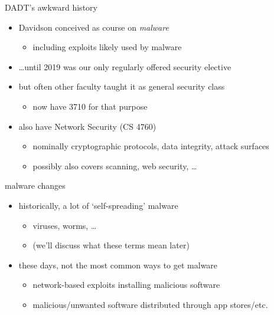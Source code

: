 \begin{frame}{DADT's awkward history}
    \begin{itemize}
    \item Davidson conceived as course on \textit{malware}
        \begin{itemize}
        \item including exploits likely used by malware
        \end{itemize}
    \item \ldots until 2019 was our only regularly offered security elective
    \vspace{.5cm}
    \item but often other faculty taught it as general security class
        \begin{itemize}
        \item now have 3710 for that purpose
        \end{itemize}
    \item also have Network Security (CS 4760)
        \begin{itemize}
        \item nominally cryptographic protocols, data integrity, attack surfaces
        \item possibly also covers scanning, web security, \ldots
        \end{itemize}
    \end{itemize}
\end{frame}

\begin{frame}{malware changes}
    \begin{itemize}
    \item historically, a lot of `self-spreading' malware
        \begin{itemize}
        \item viruses, worms, \ldots
        \item (we'll discuss what these terms mean later)
        \end{itemize}
    \item these days, not the most common ways to get malware
        \begin{itemize}
        \item network-based exploits installing malicious software
        \item malicious/unwanted software distributed through app stores/etc.
        \end{itemize}
    \end{itemize}
\end{frame}

